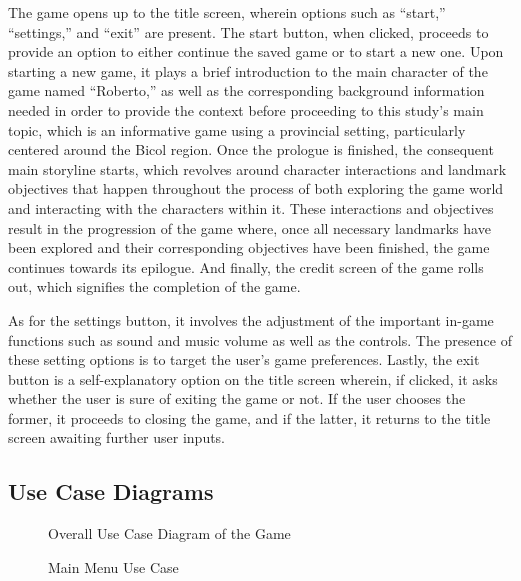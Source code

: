 \documentclass{research}
\begin{document}
The game opens up to the title screen, wherein options such as ``start,''
``settings,'' and ``exit'' are present. The start button, when clicked, proceeds to
provide an option to either continue the saved game or to start a new one. Upon
starting a new game, it plays a brief introduction to the main character of the game
named ``Roberto,'' as well as the corresponding background information needed in order
to provide the context before proceeding to this study's main topic, which is an
informative game using a provincial setting, particularly centered around the Bicol
region. Once the prologue is finished, the consequent main storyline starts, which
revolves around character interactions and landmark objectives that happen throughout
the process of both exploring the game world and interacting with the characters within
it. These interactions and objectives result in the progression of the game where, once
all necessary landmarks have been explored and their corresponding objectives have been
finished, the game continues towards its epilogue. And finally, the credit screen of
the game rolls out, which signifies the completion of the game.

As for the settings button, it involves the adjustment of the important in-game
functions such as sound and music volume as well as the controls. The presence of these
setting options is to target the user's game preferences. Lastly, the exit button is a
self-explanatory option on the title screen wherein, if clicked, it asks whether the
user is sure of exiting the game or not. If the user chooses the former, it proceeds
to closing the game, and if the latter, it returns to the title screen awaiting further
user inputs.

\subsection{Use Case Diagrams}

\begin{figure}[h!]
  \centering
  \caption{Overall Use Case Diagram of the Game}
  \label{fig:use_case_overall}
\end{figure}

\begin{figure}[h!]
  \centering
  \caption{Main Menu Use Case}
  \label{fig:use_case_main_menu}
\end{figure}
\end{document}
